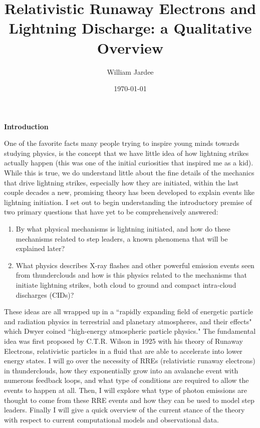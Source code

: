 \documentclass[11pt]{article}
\begin{document}
\graphicspath{{images/}}

\title{Relativistic Runaway Electrons and Lightning Discharge: a Qualitative Overview}
\author{William Jardee}
\date{\today}
\maketitle


\begin{multicols*}{2}
    

    \noindent
{\bf \LARGE Introduction}

    One of the favorite facts many people trying to inspire young minds towards studying physics, is the concept that we have little idea of how lightning strikes actually happen (this was one of the initial curiosities that inspired me as a kid). While this is true, we do understand little about the fine details of the mechanics that drive lightning strikes, especially how they are initiated, within the last couple decades a new, promising theory has been developed to explain events like lightning initiation. I set out to begin understanding the introductory premise of two primary questions that have yet to be comprehensively answered:
    \begin{enumerate}
            \item By what physical mechanisms is lightning initiated, and how do these mechanisms related to step leaders, a known phenomena that will be explained later?
            \item What physics describes X-ray flashes and other powerful emission events seen from thunderclouds and how is this physics related to the mechanisms that initiate lightning strikes, both cloud to ground and compact intra-cloud discharges (CIDs)? 
    \end{enumerate}

    These ideas are all wrapped up in a ``rapidly expanding field of energetic particle and radiation physics in terrestrial and planetary atmospheres, and their effects" which Dwyer coined ``high-energy atmospheric particle physics." The fundamental idea was first proposed by C.T.R. Wilson in 1925 with his theory of Runaway Electrons, relativistic particles in a fluid that are able to accelerate into lower energy states. I will go over the necessity of RREs (relativistic runaway electrons) in thunderclouds, how they exponentially grow into an avalanche event with numerous feedback loops, and what type of conditions are required to allow the events to happen at all. Then, I will explore what type of photon emissions are thought to come from these RRE events and how they can be used to model step leaders. Finally I will give a quick overview of the current stance of the theory with respect to current computational models and observational data. 
    \newline
    


\end{multicols*}
\end{document}
